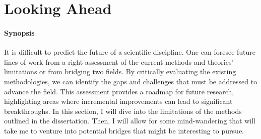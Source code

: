 \graphicspath{{ch9_futurework/}{Figures/}}

\chapter{Looking Ahead}
\label{chapter:future_work}




\subsubsection{Synopsis} It is difficult to predict the future of a scientific discipline. One can foresee future lines of work from a right assessment of the current methods and theories' limitations or from bridging two fields. By critically evaluating the existing methodologies, we can identify the gaps and challenges that must be addressed to advance the field. This assessment provides a roadmap for future research, highlighting areas where incremental improvements can lead to significant breakthroughs. In this section, I will dive into the limitations of the methods outlined in the dissertation. Then, I will allow for some mind-wandering that will take me to venture into potential bridges that might be interesting to pursue. 



